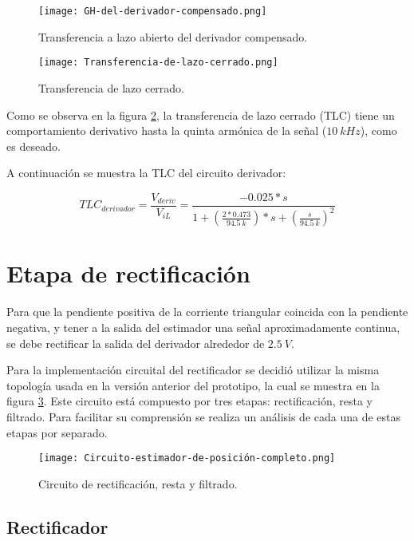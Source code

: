 \begin{figure}[H]
	\centering
	\texttt{[image: GH-del-derivador-compensado.png]}
	\caption{Transferencia a lazo abierto del derivador compensado.}
	\label{fig:img_GH del derivador compensado}
\end{figure}

\begin{figure}[H]
	\centering
	\texttt{[image: Transferencia-de-lazo-cerrado.png]}
	\caption{Transferencia de lazo cerrado.}
	\label{fig:img_Transferencia-de-lazo-cerrado}
\end{figure}

Como se observa en la figura \ref{fig:img_Transferencia-de-lazo-cerrado}, la transferencia de lazo cerrado (TLC) tiene un comportamiento derivativo hasta la quinta armónica de la señal ($10 \:kHz$), como es deseado.

A continuación se muestra la TLC del circuito derivador:

\begin{equation} \label{eq_TLC_derivador}
	{TLC}_{derivador}=\frac{V_{deriv}}{V_{iL}}=\frac{-0.025*s}{1+(\frac{2*0.473}{94.5\: k})*s+(\frac{s}{94.5\:k})^2}
\end{equation} 

\section{Etapa de rectificación}

Para que la pendiente positiva de la corriente triangular coincida con la pendiente negativa, y tener a la salida del estimador una señal aproximadamente continua, se debe rectificar la salida del derivador alrededor de $2.5\:V$.

Para la implementación circuital del rectificador se decidió utilizar la misma topología usada en la versión anterior del prototipo, la cual se muestra en la figura \ref{fig:img_Circuito_estimador_de_posición_completo}. Este circuito está compuesto por tres etapas: rectificación, resta y filtrado. Para facilitar su comprensión se realiza un análisis de cada una de estas etapas por separado.

\begin{figure}[H]
	\centering
	\texttt{[image: Circuito-estimador-de-posición-completo.png]}
	\caption{Circuito de rectificación, resta y filtrado.}
	\label{fig:img_Circuito_estimador_de_posición_completo}
\end{figure}

\subsection{Rectificador}

